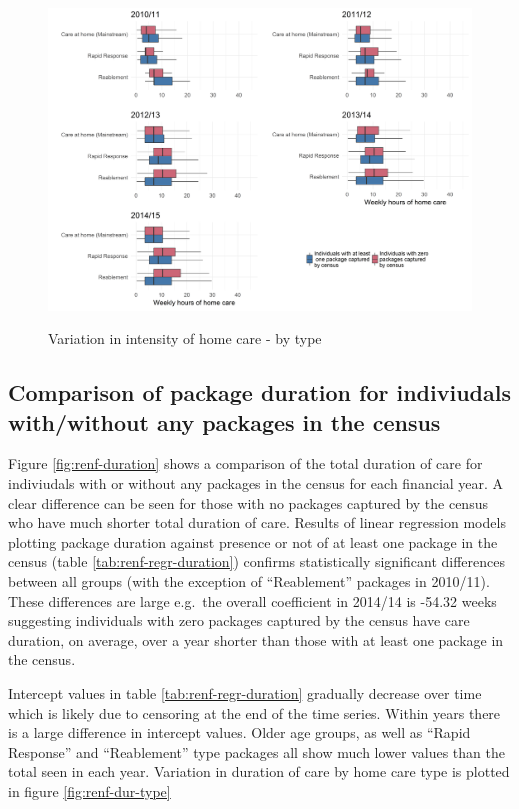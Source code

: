 \documentclass[]{article}
\begin{document}
\begin{figure}[]
  \centering
    \caption{Variation in intensity of home care - by type}
    \includegraphics{figures/chapter-renf/16-type-inten.png}
    \label{fig:renf-intensity-type}
\end{figure}

\FloatBarrier
\subsection{Comparison of package duration for indiviudals with/without any packages in the census}\label{subsec:renf-duration-diff}

Figure \ref{fig:renf-duration} shows a comparison of the total duration
of care for indiviudals with or without any packages in the census for
each financial year. A clear difference can be seen for those with no
packages captured by the census who have much shorter total duration of
care. Results of linear regression models plotting package duration
against presence or not of at least one package in the census (table
\ref{tab:renf-regr-duration}) confirms statistically significant
differences between all groups (with the exception of ``Reablement''
packages in 2010/11). These differences are large e.g.~the overall
coefficient in 2014/14 is -54.32 weeks suggesting individuals with zero
packages captured by the census have care duration, on average, over a
year shorter than those with at least one package in the census.

Intercept values in table \ref{tab:renf-regr-duration} gradually
decrease over time which is likely due to censoring at the end of the
time series. Within years there is a large difference in intercept
values. Older age groups, as well as ``Rapid Response'' and
``Reablement'' type packages all show much lower values than the total
seen in each year. Variation in duration of care by home care type is
plotted in figure \ref{fig:renf-dur-type}
\end{document}
